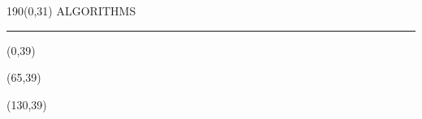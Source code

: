 \begin{textblock}{190}(0,31)
\sffamily\normalsize{\color{sciorange}ALGORITHMS}\small\\
\rule[3mm]{190mm}{0.1pt}
\end{textblock}

\begin{textblock}{60}(0,39)
    
\end{textblock}

\begin{textblock}{60}(65,39)
    
\end{textblock}

\begin{textblock}{60}(130,39)
    
\end{textblock}
